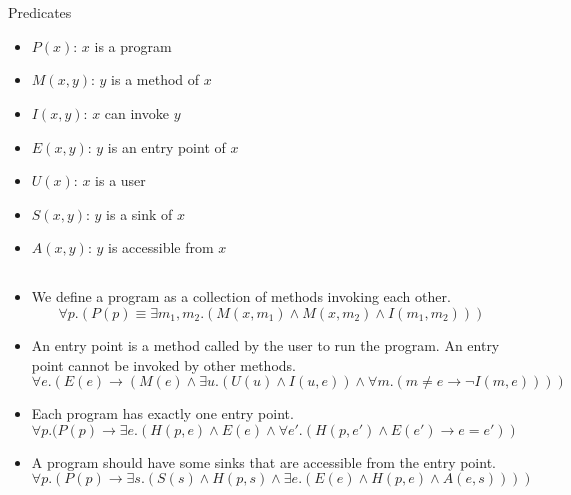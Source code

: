 \documentclass[a4paper]{article}
\begin{document}
\section{}
\subsection{}
Predicates
\begin{itemize}
	\item $P(x)$: $x$ is a program
	\item $M(x,y)$: $y$ is a method of
	      $x$
	\item $I(x,y)$: $x$ can invoke
	      $y$
	\item $E(x,y)$: $y$ is an entry point of
	      $x$
	\item $U(x)$: $x$ is a user
	\item $S(x,y)$: $y$ is a sink of
	      $x$
	\item $A(x,y)$: $y$ is accessible from
	      $x$
\end{itemize}

\subsection{}
\begin{itemize}
	\item
	      We define a program as a collection of methods invoking each other.
	      \begin{equation}
		      \label{eq:program}
		      \forall p.(P(p) \equiv \exists m_1,m_2.(M(x,m_1) \land M(x,m_2)
		      \land I(m_1, m_2)))
	      \end{equation}
	\item
	      An entry point is a method called by the user to run the program. An entry
	      point cannot be invoked by other methods.
	      \begin{equation}
		      \label{eq:entry}
		      \forall e.(E(e) \rightarrow (M(e) \land \exists u.(U(u) \land
		      I(u,e)) \land \forall m.(m \neq e \rightarrow \lnot I(m,e))))
	      \end{equation}
	\item
	      Each program has exactly one entry point.
	      \begin{equation}
		      \forall p.(P(p) \rightarrow \exists e.(H(p,e) \land E(e)
		      \land \forall e'.(H(p,e') \land E(e') \rightarrow e=e'))
	      \end{equation}
	\item
	      A program should have some sinks that are accessible from the entry point.
	      \begin{equation}
		      \forall p.(P(p) \rightarrow \exists s.(S(s) \land H(p,s)
		      \land \exists e.(E(e) \land H(p,e) \land A(e,s))))
	      \end{equation}
\end{itemize}
\end{document}
